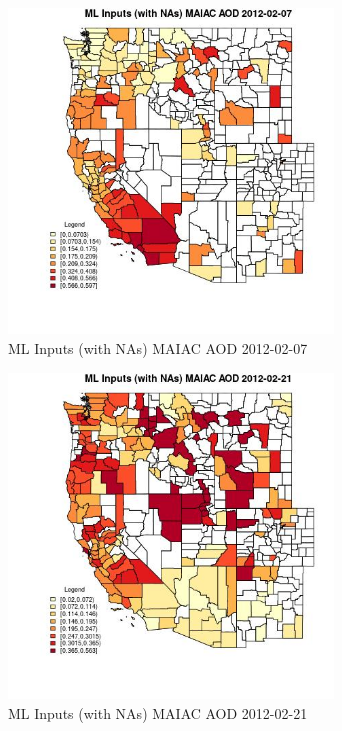 \begin{figure} 
\centering  
\includegraphics[width=0.77\textwidth]{Code_Outputs/Report_ML_input_PM25_Step4_part_f_de_duplicated_aves_prioritize_24hr_obswNAs_CountyMAIAC_AODMean2012-02-07.jpg} 
\caption{\label{fig:Report_ML_input_PM25_Step4_part_f_de_duplicated_aves_prioritize_24hr_obswNAsCountyMAIAC_AODMean2012-02-07}ML Inputs (with NAs) MAIAC AOD 2012-02-07} 
\end{figure} 
 

\begin{figure} 
\centering  
\includegraphics[width=0.77\textwidth]{Code_Outputs/Report_ML_input_PM25_Step4_part_f_de_duplicated_aves_prioritize_24hr_obswNAs_CountyMAIAC_AODMean2012-02-21.jpg} 
\caption{\label{fig:Report_ML_input_PM25_Step4_part_f_de_duplicated_aves_prioritize_24hr_obswNAsCountyMAIAC_AODMean2012-02-21}ML Inputs (with NAs) MAIAC AOD 2012-02-21} 
\end{figure} 
 

